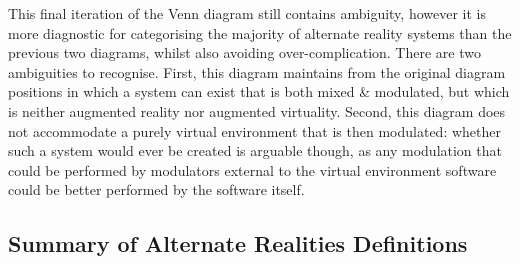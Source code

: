 This final iteration of the Venn diagram still contains ambiguity, however it is more diagnostic for categorising the majority of alternate reality systems than the previous two diagrams, whilst also avoiding over-complication. There are two ambiguities to recognise. First, this diagram maintains from the original diagram positions in which a system can exist that is both mixed \& modulated, but which is neither augmented reality nor augmented virtuality. Second, this diagram does not accommodate a purely virtual environment that is then modulated: whether such a system would ever be created is arguable though, as any modulation that could be performed by modulators external to the virtual environment software could be better performed by the software itself.


\clearpage

\subsection{Summary of Alternate Realities Definitions}
\label{summaryofalternaterealitydefinitions}



